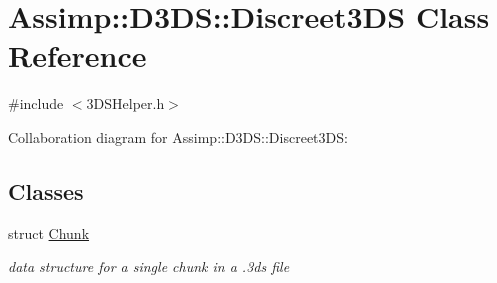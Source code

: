 \hypertarget{class_assimp_1_1_d3_d_s_1_1_discreet3_d_s}{\section{Assimp\+:\+:D3\+D\+S\+:\+:Discreet3\+D\+S Class Reference}
\label{class_assimp_1_1_d3_d_s_1_1_discreet3_d_s}
}


{\ttfamily \#include $<$3\+D\+S\+Helper.\+h$>$}



Collaboration diagram for Assimp\+:\+:D3\+D\+S\+:\+:Discreet3\+D\+S\+:
\subsection*{Classes}
\begin{DoxyCompactItemize}
\item 
struct \hyperlink{struct_assimp_1_1_d3_d_s_1_1_discreet3_d_s_1_1_chunk}{Chunk}
\begin{DoxyCompactList}\small\item\em data structure for a single chunk in a .3ds file \end{DoxyCompactList}\end{DoxyCompactItemize}
